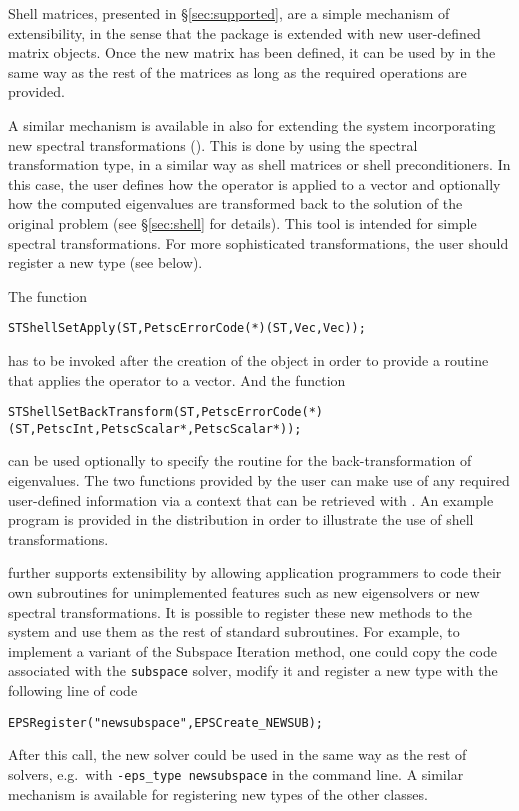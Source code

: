 Shell matrices, presented in \S\ref{sec:supported}, are a simple mechanism of extensibility, in the sense that the package is extended with new user-defined matrix objects. Once the new matrix has been defined, it can be used by \slepc in the same way as the rest of the matrices as long as the required operations are provided.

A similar mechanism is available in \slepc also for extending the system incorporating new spectral transformations (). This is done by using the  spectral transformation type, in a similar way as shell matrices or shell preconditioners. In this case, the user defines how the operator is applied to a vector and optionally how the computed eigenvalues are transformed back to the solution of the original problem (see \S\ref{sec:shell} for details). This tool is intended for simple spectral transformations. For more sophisticated transformations, the user should register a new  type (see below).

The function
        \begin{Verbatim}[fontsize=\small]
      STShellSetApply(ST,PetscErrorCode(*)(ST,Vec,Vec));
        \end{Verbatim}
has to be invoked after the creation of the  object in order to provide a routine that applies the operator to a vector. And the function
        \begin{Verbatim}[fontsize=\small]
      STShellSetBackTransform(ST,PetscErrorCode(*)(ST,PetscInt,PetscScalar*,PetscScalar*));
        \end{Verbatim}
can be used optionally to specify the routine for the back-transformation of eigenvalues. The two functions provided by the user can make use of any required user-defined information via a context that can be retrieved with . An example program is provided in the \slepc distribution in order to illustrate the use of shell transformations.

\slepc further supports extensibility by allowing application programmers to code their own subroutines for unimplemented features such as new eigensolvers or new spectral transformations. It is possible to register these new methods to the system and use them as the rest of standard subroutines. For example, to implement a variant of the Subspace Iteration method, one could copy the \slepc code associated with the \texttt{subspace} solver, modify it and register a new  type with the following line of code
        \begin{Verbatim}[fontsize=\small]
        EPSRegister("newsubspace",EPSCreate_NEWSUB);
        \end{Verbatim}
After this call, the new solver could be used in the same way as the rest of \slepc solvers, e.g.\ with \texttt{-eps\_type newsubspace} in the command line.
A similar mechanism is available for registering new types of the other classes.

